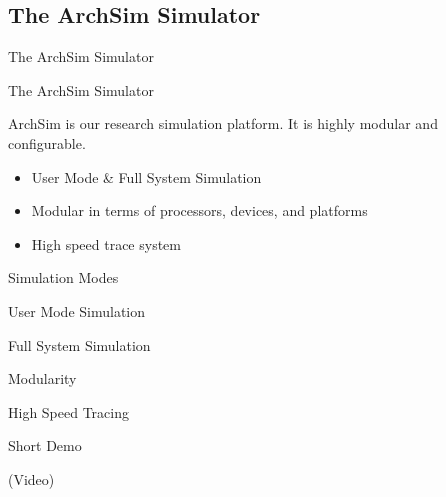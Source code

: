 \subsection{The ArchSim Simulator}

\begin{frame}{The ArchSim Simulator}

\end{frame}

\begin{frame}{The ArchSim Simulator}

ArchSim is our research simulation platform. It is highly modular and configurable.

\begin{itemize}
	\item User Mode \& Full System Simulation
	\item Modular in terms of processors, devices, and platforms
	\item High speed trace system
\end{itemize}

\end{frame}

\begin{frame}{Simulation Modes}

User Mode Simulation

Full System Simulation

\end{frame}

\begin{frame}{Modularity}


\end{frame}

\begin{frame}{High Speed Tracing}


\end{frame}

\begin{frame}{Short Demo}

(Video)

\end{frame}
